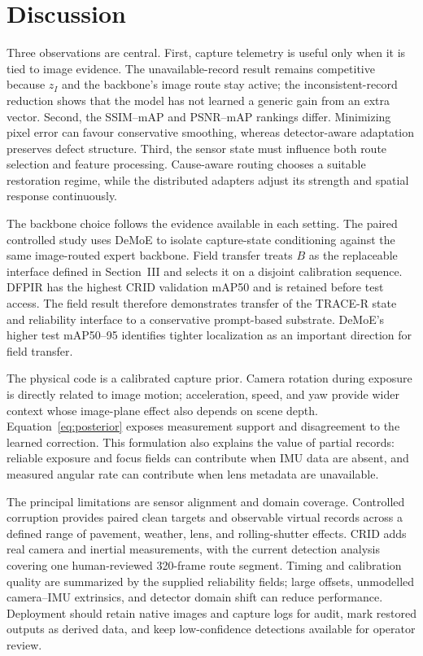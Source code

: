 \documentclass[journal]{IEEEtran}
\begin{document}
\section{Discussion}
Three observations are central. First, capture telemetry is useful only when it is tied to image evidence. The unavailable-record result remains competitive because $z_I$ and the backbone's image route stay active; the inconsistent-record reduction shows that the model has not learned a generic gain from an extra vector. Second, the SSIM--mAP and PSNR--mAP rankings differ. Minimizing pixel error can favour conservative smoothing, whereas detector-aware adaptation preserves defect structure. Third, the sensor state must influence both route selection and feature processing. Cause-aware routing chooses a suitable restoration regime, while the distributed adapters adjust its strength and spatial response continuously.

The backbone choice follows the evidence available in each setting. The paired controlled study uses DeMoE to isolate capture-state conditioning against the same image-routed expert backbone. Field transfer treats $B$ as the replaceable interface defined in Section~III and selects it on a disjoint calibration sequence. DFPIR has the highest CRID validation mAP50 and is retained before test access. The field result therefore demonstrates transfer of the TRACE-R state and reliability interface to a conservative prompt-based substrate. DeMoE's higher test mAP50--95 identifies tighter localization as an important direction for field transfer.

The physical code is a calibrated capture prior. Camera rotation during exposure is directly related to image motion; acceleration, speed, and yaw provide wider context whose image-plane effect also depends on scene depth. Equation~\eqref{eq:posterior} exposes measurement support and disagreement to the learned correction. This formulation also explains the value of partial records: reliable exposure and focus fields can contribute when IMU data are absent, and measured angular rate can contribute when lens metadata are unavailable.

The principal limitations are sensor alignment and domain coverage. Controlled corruption provides paired clean targets and observable virtual records across a defined range of pavement, weather, lens, and rolling-shutter effects. CRID adds real camera and inertial measurements, with the current detection analysis covering one human-reviewed 320-frame route segment. Timing and calibration quality are summarized by the supplied reliability fields; large offsets, unmodelled camera--IMU extrinsics, and detector domain shift can reduce performance. Deployment should retain native images and capture logs for audit, mark restored outputs as derived data, and keep low-confidence detections available for operator review.
\end{document}
